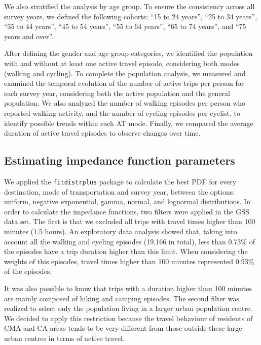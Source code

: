 \documentclass[preprint, 3p,
authoryear]{elsarticle} %
\begin{document}
We also stratified the analysis by age group. To ensure the consistency
across all survey years, we defined the following cohorts: ``15 to 24
years'', ``25 to 34 years'', ``35 to 44 years'', ``45 to 54 years'',
``55 to 64 years'', ``65 to 74 years'', and ``75 years and over''.

After defining the gender and age group categories, we identified the
population with and without at least one active travel episode,
considering both modes (walking and cycling). To complete the population
analysis, we measured and examined the temporal evolution of the number
of active trips per person for each survey year, considering both the
active population and the general population. We also analyzed the
number of walking episodes per person who reported walking activity, and
the number of cycling episodes per cyclist, to identify possible trends
within each AT mode. Finally, we compared the average duration of active
travel episodes to observe changes over time.

\subsection{Estimating impedance function
parameters}\label{estimating-impedance-function-parameters}

We applied the \texttt{fitdistrplus} package
\citep{delignette2015fitdistrplus} to calculate the best PDF for every
destination, mode of transportation and survey year, between the
options: uniform, negative exponential, gamma, normal, and lognormal
distributions. In order to calculate the impedance functions, two
filters were applied in the GSS data set. The first is that we excluded
all trips with travel times higher than 100 minutes (1.5 hours). An
exploratory data analysis showed that, taking into account all the
walking and cycling episodes (19,166 in total), less than 0.73\% of the
episodes have a trip duration higher than this limit. When considering
the weights of this episodes, travel times higher than 100 minutes
represented 0.93\% of the episodes.

It was also possible to know that trips with a duration higher than 100
minutes are mainly composed of hiking and camping episodes. The second
filter was realized to select only the population living in a larger
urban population centre. We decided to apply this restriction because
the travel behaviour of residents of CMA and CA areas tends to be very
different from those outside these large urban centres in terms of
active travel.
\end{document}
